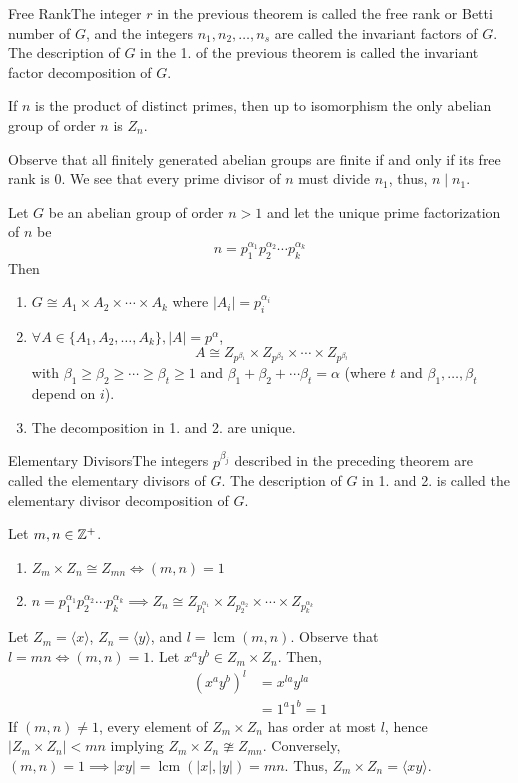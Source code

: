 \documentclass{report}
\newcommand{\thm}[2]{\begin{Theorem}{#1}{}#2\end{Theorem}}
\newcommand{\cor}[2]{\begin{Corollary}{#1}{}#2\end{Corollary}}
\newcommand{\mprop}[2]{\begin{Prop}{#1}{}#2\end{Prop}}
\newcommand{\dfn}[2]{\begin{Definition}[colbacktitle=red!75!black]{#1}{}#2\end{Definition}}
\newenvironment{myproof}[1][\proofname]{%
	\proof[\bfseries #1: ]%
}{\endproof}
\DeclareMathOperator*{\lcm}{lcm}
\begin{document}
\dfn{Free Rank}{The integer $r$ in the previous theorem is called the free rank or Betti number of $G$, and the integers $n_1, n_2, \dots, n_s$ are called the invariant factors of $G$. The description of $G$ in the 1. of the previous theorem is called the invariant factor decomposition of $G$. }
\cor{}{If $n$ is the product of distinct primes, then up to isomorphism the only abelian group of order $n$ is $Z_n$. }
\begin{myproof}
    Observe that all finitely generated abelian groups are finite if and only if its free rank is 0. We see that every prime divisor of $n$ must divide $n_1$, thus, $n \mid n_1$. 
\end{myproof}
\thm{}{Let $G$ be an abelian group of order $n > 1$ and let the unique prime factorization of $n$ be 
$$n = p_1^{\alpha_1}p_2^{\alpha_2}\cdots p_k^{\alpha_k}$$
Then
\begin{enumerate}
    \item $G \cong A_1 \times A_2 \times \cdots \times A_k$ where $|A_i| = p_i^{\alpha_i}$
    \item $\forall A \in \{A_1, A_2, \dots, A_k\}, |A| = p^\alpha$, 
    $$A \cong Z_{p^{\beta_1}}\times Z_{p^{\beta_2}}\times \cdots \times Z_{p^{\beta_t}}$$
    with $\beta_1 \geq \beta_2 \geq \cdots \geq \beta_t \geq 1$ and $\beta_1 + \beta_2 + \cdots \beta_t = \alpha$ (where $t$ and $\beta_1 , \dots, \beta_t$ depend on $i$). 
    \item The decomposition in 1. and 2. are unique. 
\end{enumerate}}

\dfn{Elementary Divisors}{The integers $p^{\beta_j}$ described in the preceding theorem are called the elementary divisors of $G$. The description of $G$ in 1. and 2. is called the elementary divisor decomposition of $G$. }
\mprop{}{Let $m, n \in \mathbb{Z}^+$. \begin{enumerate}
    \item $Z_m \times Z_n \cong Z_{mn} \iff (m,n) = 1$
    \item $n = p_1^{\alpha_1}p_2^{\alpha_2} \cdots p_k^{\alpha_k} \implies Z_n \cong Z_{p_1^{\alpha_1}} \times Z_{p_2^{\alpha_2}} \times \cdots \times Z_{p_k^{\alpha_k}}$
\end{enumerate}}
\begin{myproof}
    Let $Z_m = \langle x\rangle$, $Z_n = \langle y \rangle$, and $l = \lcm(m,n)$. Observe that $l = mn \iff (m,n) = 1$. Let $x^a y^b \in Z_m \times Z_n$. Then, 
    \begin{align*}
        (x^a y^b)^l &= x^{la} y^{la}\\
        &= 1^a 1^b = 1
    \end{align*}
    If $(m,n) \neq 1$, every element of $Z_m \times Z_n$ has order at most $l$, hence $|Z_m \times Z_n| < mn$ implying  $Z_m \times Z_n \ncong Z_{mn}$. 
    Conversely, $(m,n) = 1 \implies |xy| = \lcm(|x|, |y|) = mn$. Thus, $Z_m \times Z_n = \langle xy\rangle$. 
\end{myproof}
\end{document}
